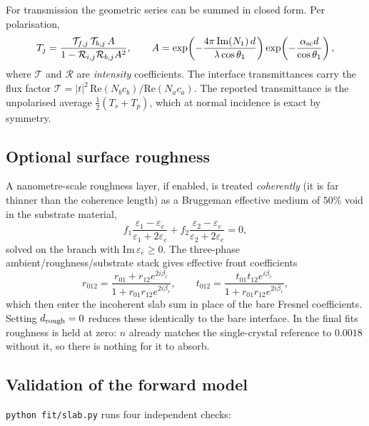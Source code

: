 \documentclass[11pt,a4paper]{article}
\newcommand{\epsm}{\varepsilon}
\newcommand{\lam}{\lambda}
\begin{document}
For transmission the geometric series can be summed in closed form. Per
polarisation,
\begin{equation}
T_j=\frac{\mathcal{T}_{f,j}\,\mathcal{T}_{b,j}\,A}
         {1-\mathcal{R}_{i,j}\mathcal{R}_{b,j}A^2},
\qquad
A=\exp\!\left(-\frac{4\pi\,\mathrm{Im}(N_1)\,d}{\lam\cos\theta_1}\right)
  \exp\!\left(-\frac{\alpha_{\rm sc}d}{\cos\theta_1}\right),
\label{eq:trans}
\end{equation}
where $\mathcal{T}$ and $\mathcal{R}$ are \emph{intensity} coefficients. The
interface transmittances carry the flux factor
$\mathcal{T}=|t|^2\,\mathrm{Re}(N_b c_b)/\mathrm{Re}(N_a c_a)$. The reported
transmittance is the unpolarised average $\tfrac12(T_s+T_p)$, which at normal
incidence is exact by symmetry.

\subsection{Optional surface roughness}

A nanometre-scale roughness layer, if enabled, is treated \emph{coherently}
(it is far thinner than the coherence length) as a Bruggeman effective medium of
$50\%$ void in the substrate material,
\begin{equation}
f_1\frac{\epsm_1-\epsm_e}{\epsm_1+2\epsm_e}
+f_2\frac{\epsm_2-\epsm_e}{\epsm_2+2\epsm_e}=0 ,
\end{equation}
solved on the branch with $\mathrm{Im}\,\epsm_e\ge0$. The three-phase
ambient/roughness/substrate stack gives effective front coefficients
\begin{equation}
r_{012}=\frac{r_{01}+r_{12}e^{2i\beta_r}}{1+r_{01}r_{12}e^{2i\beta_r}},
\qquad
t_{012}=\frac{t_{01}t_{12}e^{i\beta_r}}{1+r_{01}r_{12}e^{2i\beta_r}},
\end{equation}
which then enter the incoherent slab sum in place of the bare Fresnel
coefficients. Setting $d_{\rm rough}=0$ reduces these identically to the bare
interface. In the final fits roughness is held at zero: $n$ already matches the
single-crystal reference to $0.0018$ without it, so there is nothing for it to
absorb.

\subsection{Validation of the forward model}
\label{sec:slabtests}

\texttt{python fit/slab.py} runs four independent checks:
\end{document}
